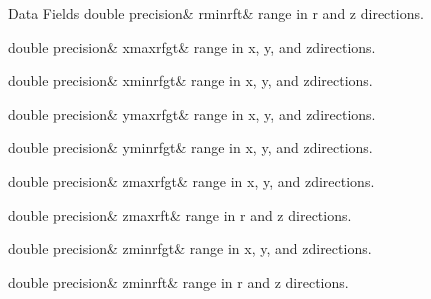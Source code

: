\begin{DoxyFields}{Data Fields}
\mbox{\label{namespacedataclass_a50959e96924c22806be36879d08f8342}} 
double precision&
rminrft&
range in r and z directions. \\
\hline

\mbox{\label{namespacedataclass_ac91ac792a03611b9d7ea7e9491a9f932}} 
double precision&
xmaxrfgt&
range in x, y, and zdirections. \\
\hline

\mbox{\label{namespacedataclass_a48a580850e3d44d65f42d8c6a5c7892c}} 
double precision&
xminrfgt&
range in x, y, and zdirections. \\
\hline

\mbox{\label{namespacedataclass_a41bea18fe0cd9cb24dcab4f811a53d20}} 
double precision&
ymaxrfgt&
range in x, y, and zdirections. \\
\hline

\mbox{\label{namespacedataclass_a817fb5a469a1095749da14db38aaff2b}} 
double precision&
yminrfgt&
range in x, y, and zdirections. \\
\hline

\mbox{\label{namespacedataclass_aa1e1937a10ecb4f84e61ab79dfc8b0e3}} 
double precision&
zmaxrfgt&
range in x, y, and zdirections. \\
\hline

\mbox{\label{namespacedataclass_a8302c4d489f349d54ff3fa17ae25ae4a}} 
double precision&
zmaxrft&
range in r and z directions. \\
\hline

\mbox{\label{namespacedataclass_a7f273248f53c831222242a3cccedd14e}} 
double precision&
zminrfgt&
range in x, y, and zdirections. \\
\hline

\mbox{\label{namespacedataclass_a2f063280da3bc87a3bd10bdef7fce0f0}} 
double precision&
zminrft&
range in r and z directions. \\
\hline

\end{DoxyFields}


